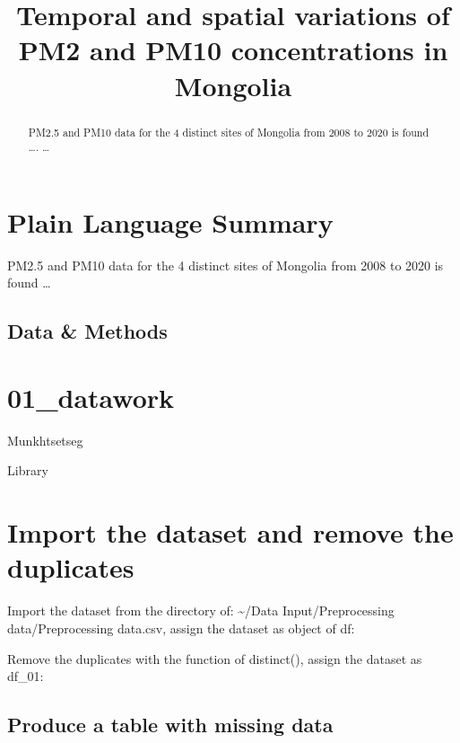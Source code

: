 \documentclass[
]{agujournal2019}
\begin{document}
\title{Temporal and spatial variations of PM2 and PM10 concentrations in
Mongolia}



\begin{abstract}
PM2.5 and PM10 data for the 4 distinct sites of Mongolia from 2008 to
2020 is found \ldots. \ldots{}
\end{abstract}

\section*{Plain Language Summary}
PM2.5 and PM10 data for the 4 distinct sites of Mongolia from 2008 to
2020 is found \ldots{}



\subsection{Data \& Methods}\label{sec-data-methods}

\section{01\_datawork}\label{datawork}

Munkhtsetseg

Library

\section{Import the dataset and remove the
duplicates}\label{import-the-dataset-and-remove-the-duplicates}

Import the dataset from the directory of: \textasciitilde/Data
Input/Preprocessing data/Preprocessing data.csv, assign the dataset as
object of df:

Remove the duplicates with the function of distinct(), assign the
dataset as df\_01:

\subsection{Produce a table with missing
data}\label{produce-a-table-with-missing-data}
\end{document}

